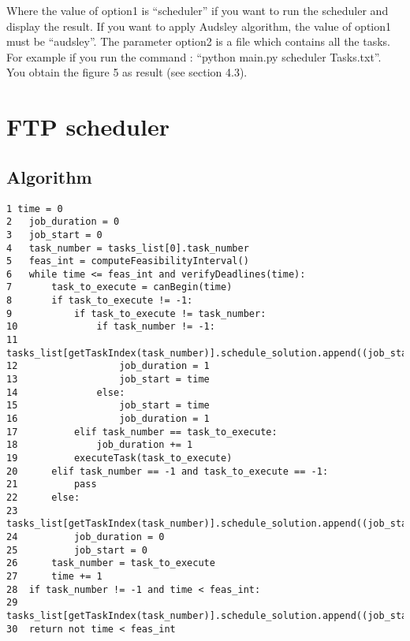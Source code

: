 \documentclass[a4paper,12pt]{article}
\begin{document}
\noindent
Where the value of option1 is ``scheduler'' if you want to run the scheduler and display the result. If you want to apply Audsley algorithm, the value of option1 must be ``audsley''. The parameter option2 is a file which contains all the tasks. For example if you run the command : ``python main.py scheduler Tasks.txt''. You obtain the figure 5 as result (see section 4.3). 

\newpage

\section{FTP scheduler}
\subsection{Algorithm}


\begin{lstlisting}
1 time = 0
2	job_duration = 0
3	job_start = 0 
4	task_number = tasks_list[0].task_number
5	feas_int = computeFeasibilityInterval()
6	while time <= feas_int and verifyDeadlines(time):
7		task_to_execute = canBegin(time)
8		if task_to_execute != -1:
9			if task_to_execute != task_number:
10				if task_number != -1:
11					tasks_list[getTaskIndex(task_number)].schedule_solution.append((job_start,job_duration))
12					job_duration = 1
13					job_start = time
14				else:
15					job_start = time
16					job_duration = 1
17			elif task_number == task_to_execute:
18				job_duration += 1
19			executeTask(task_to_execute)
20		elif task_number == -1 and task_to_execute == -1:
21			pass
22		else:
23			tasks_list[getTaskIndex(task_number)].schedule_solution.append((job_start,job_duration))
24			job_duration = 0
25			job_start = 0 
26		task_number = task_to_execute
27		time += 1
28	if task_number != -1 and time < feas_int:
29		tasks_list[getTaskIndex(task_number)].schedule_solution.append((job_start,job_duration))
30	return not time < feas_int
\end{lstlisting}
\end{document}

